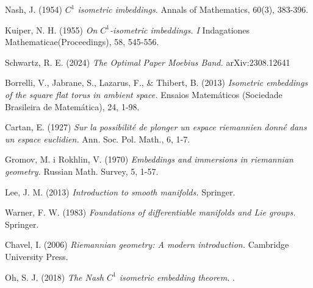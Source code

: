 \documentclass[11pt,a4paper,openright,oneside]{book}
\numberwithin{equation}{section}
\theoremstyle{definition}
\begin{document}
\newpage

\begin{thebibliography}{25}

Nash, J. (1954)
\newblock \textit{$C^1$ isometric imbeddings.}
\newblock Annals of Mathematics, 60(3), 383-396.

Kuiper, N. H. (1955)
\newblock \textit{On $C^1$-isometric imbeddings. I}
\newblock Indagationes Mathematicae(Proceedings), 58, 545-556.

Schwartz, R. E. (2024)
\newblock \textit{The Optimal Paper Moebius Band.}
\newblock arXiv:2308.12641

Borrelli, V., Jabrane, S., Lazarus, F., \& Thibert, B. (2013)
\newblock \textit{Isometric embeddings of the square flat torus in ambient space.}
\newblock Ensaios Matemáticos (Sociedade Brasileira de Matemática), 24, 1-98.

Cartan, E. (1927)
\newblock \textit{Sur la possibilité de plonger un espace riemannien donné dans un espace euclidien.}
\newblock Ann. Soc. Pol. Math., 6, 1-7.

Gromov, M. i Rokhlin, V. (1970)
\newblock \textit{Embeddings and immersions in riemannian geometry.}
\newblock Russian Math. Survey, 5, 1-57.

Lee, J. M. (2013)
\newblock \textit{Introduction to smooth manifolds.}
\newblock Springer.

Warner, F. W. (1983)
\newblock \textit{Foundations of differentiable manifolds and Lie groups.}
\newblock Springer.

Chavel, I. (2006)
\newblock \textit{Riemannian geometry: A modern introduction.}
\newblock Cambridge University Press.

Oh, S. J. (2018)
\newblock \textit{The Nash $C^1$ isometric embedding theorem.}
.





\end{thebibliography}
\end{document}
